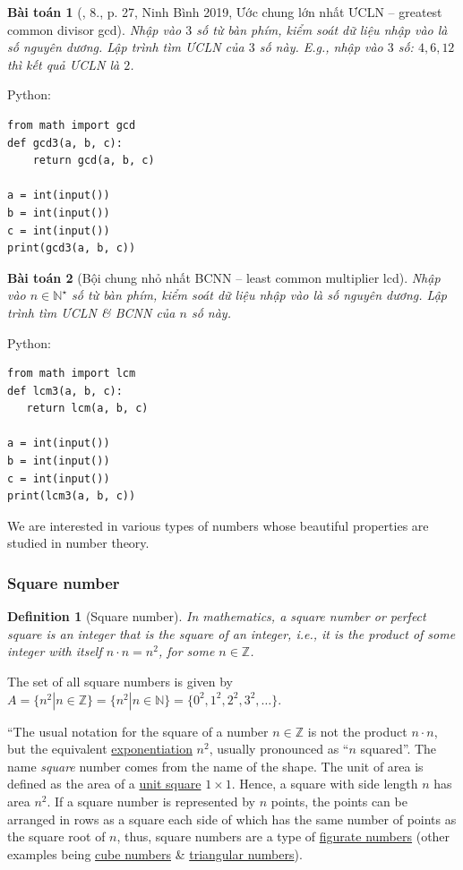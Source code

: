 \documentclass{article}
\newtheorem{baitoan}{Bài toán}
\newtheorem{definition}{Definition}
\begin{document}
\begin{baitoan}[\cite{VietSTEM2021}, 8., p. 27, Ninh Bình 2019, Ước chung lớn nhất ƯCLN -- greatest common divisor gcd]
	Nhập vào $3$ số từ bàn phím, kiểm soát dữ liệu nhập vào là số nguyên dương. Lập trình tìm \emph{ƯCLN} của $3$ số này. E.g., nhập vào $3$ số: $4,6,12$ thì kết quả \emph{ƯCLN} là $2$.
\end{baitoan}
Python:
\begin{verbatim}
from math import gcd
def gcd3(a, b, c):
    return gcd(a, b, c)

a = int(input())
b = int(input())
c = int(input())
print(gcd3(a, b, c))
\end{verbatim}

\begin{baitoan}[Bội chung nhỏ nhất BCNN -- least common multiplier lcd]
	Nhập vào $n\in\mathbb{N}^\star$ số từ bàn phím, kiểm soát dữ liệu nhập vào là số nguyên dương. Lập trình tìm \emph{ƯCLN} \& \emph{BCNN} của $n$ số này.
\end{baitoan}
Python:
\begin{verbatim}
from math import lcm
def lcm3(a, b, c):
   return lcm(a, b, c)

a = int(input())
b = int(input())
c = int(input())
print(lcm3(a, b, c))
\end{verbatim}
We are interested in various types of numbers whose beautiful properties are studied in number theory.

\subsubsection{Square number}

\begin{definition}[Square number]
	In mathematics, a \emph{square number} or \emph{perfect square} is an integer that is the square of an integer, i.e., it is the product of some integer with itself $n\cdot n = n^2$, for some $n\in\mathbb{Z}$. 
\end{definition}
The set of all square numbers is given by $A = \{n^2|n\in\mathbb{Z}\} = \{n^2|n\in\mathbb{N}\} = \{0^2,1^2,2^2,3^2,\ldots\}$.
 
``The usual notation for the square of a number $n\in\mathbb{Z}$ is not the product $n\cdot n$, but the equivalent \href{https://en.wikipedia.org/wiki/Exponentiation}{exponentiation} $n^2$, usually pronounced as ``$n$ squared''. The name \textit{square} number comes from the name of the shape. The unit of area is defined as the area of a \href{https://en.wikipedia.org/wiki/Unit_square}{unit square} $1\times1$. Hence, a square with side length $n$ has area $n^2$. If a square number is represented by $n$ points, the points can be arranged in rows as a square each side of which has the same number of points as the square root of $n$, thus, square numbers are a type of \href{https://en.wikipedia.org/wiki/Figurate_number}{figurate numbers} (other examples being \href{https://en.wikipedia.org/wiki/Cube_(algebra)}{cube numbers} \& \href{https://en.wikipedia.org/wiki/Triangular_numbers}{triangular numbers}).
\end{document}
